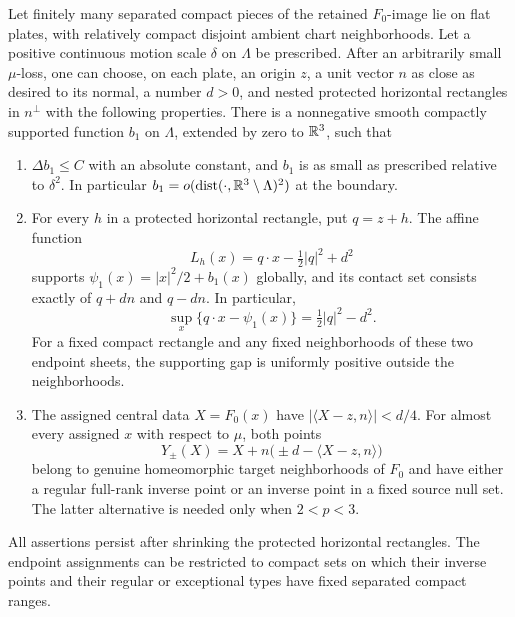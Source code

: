 \begin{lemma}\label{hp:wells}
Let finitely many separated compact pieces of the retained $F_0$-image
lie on flat plates, with relatively compact disjoint ambient chart
neighborhoods.  Let a positive continuous motion scale $\delta$ on
$\Lambda$ be prescribed.  After an arbitrarily small $\mu$-loss, one can
choose, on each plate, an origin $z$, a unit vector $n$ as close as
desired to its normal, a number $d>0$, and nested protected horizontal
rectangles in $n^\perp$ with the following properties.
There is a nonnegative smooth compactly supported function $b_1$ on
$\Lambda$, extended by zero to $\mathbb R^3$, such that
\begin{enumerate}[label=\textup{(\roman*)}]
\item $\Delta b_1\leq C$ with an absolute constant, and $b_1$ is as
small as prescribed relative to $\delta^2$.  In particular
$b_1=o(\operatorname{dist}(\cdot,\mathbb R^3\setminus\Lambda)^2)$ at the boundary.
\item For every $h$ in a protected horizontal rectangle, put $q=z+h$.
The affine function
\[
 L_h(x)=q\cdot x-\tfrac12|q|^2+d^2
\]
supports $\psi_1(x)=|x|^2/2+b_1(x)$ globally, and its contact set
consists exactly of $q+dn$ and $q-dn$.  In particular,
\begin{equation}\label{hp:paired-dual-value}
 \sup_x\{q\cdot x-\psi_1(x)\}=\tfrac12|q|^2-d^2.
\end{equation}
For a fixed compact rectangle and any fixed neighborhoods of these
two endpoint sheets, the supporting gap is uniformly positive outside
the neighborhoods.
\item The assigned central data $X=F_0(x)$ have
$|\langle X-z,n\rangle|<d/4$.  For almost every assigned $x$ with
respect to $\mu$, both points
\begin{equation}\label{hp:sampled-endpoints}
 Y_\pm(X)=X+n\bigl(\pm d-\langle X-z,n\rangle\bigr)
\end{equation}
belong to genuine homeomorphic target neighborhoods of $F_0$ and have
either a regular full-rank inverse point or an inverse point in a fixed
source null set.  The latter alternative is needed only when $2<p<3$.
\end{enumerate}
All assertions persist after shrinking the protected horizontal
rectangles.  The endpoint assignments can be restricted to compact
sets on which their inverse points and their regular or exceptional
types have fixed separated compact ranges.
\end{lemma}

